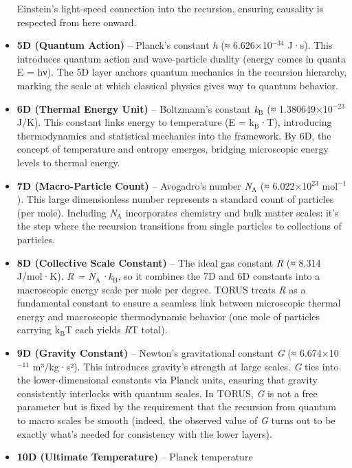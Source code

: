 \documentclass[]{article}
\newcommand{\subscript}[1]{\ensuremath{_{\mathrm{#1}}}}
\newcommand{\superscript}[1]{\ensuremath{^{\mathrm{#1}}}}
\begin{document}
\begin{itemize}
  Einstein's light-speed connection into the recursion, ensuring
  causality is respected from here onward.
\item
  \textbf{5D (Quantum Action)} -- Planck's constant \emph{h} (≈
  6.626×10\superscript{−34} J·s)​. This introduces quantum action and
  wave-particle duality (energy comes in quanta E = hν). The 5D layer
  anchors quantum mechanics in the recursion hierarchy, marking the
  scale at which classical physics gives way to quantum behavior.
\item
  \textbf{6D (Thermal Energy Unit)} -- Boltzmann's constant
  \emph{k\subscript{B}} (≈
  1.380649×10\superscript{−23} J/K)​. This constant links energy to temperature (E
  = k\subscript{B}·T),
  introducing thermodynamics and statistical mechanics into the
  framework. By 6D, the concept of temperature and entropy emerges,
  bridging microscopic energy levels to thermal energy.
\item
  \textbf{7D (Macro-Particle Count)} -- Avogadro's number
  \emph{N\subscript{A}} (≈
  6.022×10\superscript{23} mol\superscript{−1})​. This large dimensionless number represents
  a standard count of particles (per mole). Including
  \emph{N\subscript{A}}
  incorporates chemistry and bulk matter scales: it's the step where the
  recursion transitions from single particles to collections of
  particles.
\item
  \textbf{8D (Collective Scale Constant)} -- The ideal gas constant
  \emph{R} (≈ 8.314 J/mol·K)​. \emph{R =
  N\subscript{A}·k\subscript{B}},
  so it combines the 7D and 6D constants into a macroscopic energy scale
  per mole per degree​. TORUS treats \emph{R} as a fundamental constant
  to ensure a seamless link between microscopic thermal energy and
  macroscopic thermodynamic behavior (one mole of particles carrying
  k\subscript{B}T each
  yields \emph{R}T total)​.
\item
  \textbf{9D (Gravity Constant)} -- Newton's gravitational constant
  \emph{G} (≈ 6.674×10\superscript{−11} m³/kg·s²)​. This introduces gravity's
  strength at large scales. \emph{G} ties into the lower-dimensional
  constants via Planck units, ensuring that gravity consistently
  interlocks with quantum scales​. In TORUS, \emph{G} is not a free
  parameter but is fixed by the requirement that the recursion from
  quantum to macro scales be smooth (indeed, the observed value of
  \emph{G} turns out to be exactly what's needed for consistency with
  the lower layers)​.
\item
  \textbf{10D (Ultimate Temperature)} -- Planck temperature

\end{itemize}
\end{document}
